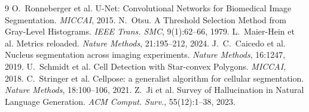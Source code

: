 \documentclass[a4paper,9pt,twocolumn]{extarticle}
\begin{document}
{\scriptsize

\begin{thebibliography}{9}
\setlength{\itemsep}{-1pt}\setlength{\parskip}{0pt}
 O.~Ronneberger et al. U-Net: Convolutional Networks
for Biomedical Image Segmentation. \textit{MICCAI}, 2015.
 N.~Otsu. A Threshold Selection Method from Gray-Level
Histograms. \textit{IEEE Trans. SMC}, 9(1):62--66, 1979.
 L.~Maier-Hein et al. Metrics reloaded. \textit{Nature
Methods}, 21:195--212, 2024.
 J.~C.~Caicedo et al. Nucleus segmentation across imaging
experiments. \textit{Nature Methods}, 16:1247, 2019.
 U.~Schmidt et al. Cell Detection with Star-convex
Polygons. \textit{MICCAI}, 2018.
 C.~Stringer et al. Cellpose: a generalist algorithm for
cellular segmentation. \textit{Nature Methods}, 18:100--106, 2021.
 Z.~Ji et al. Survey of Hallucination in Natural Language
Generation. \textit{ACM Comput. Surv.}, 55(12):1--38, 2023.
\end{thebibliography}
}
\end{document}
